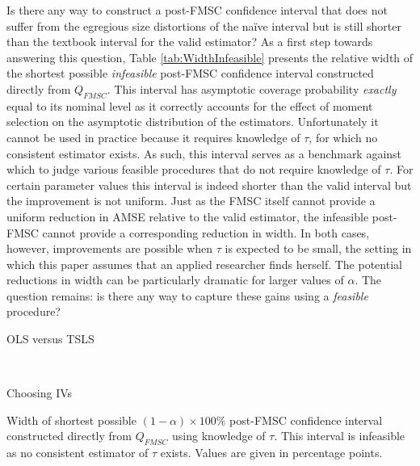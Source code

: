 Is there any way to construct a post-FMSC confidence interval that does not suffer from the egregious size distortions of the na\"{i}ve interval but is still shorter than the textbook interval for the valid estimator?
As a first step towards answering this question, Table \ref{tab:WidthInfeasible} presents the relative width of the shortest possible \emph{infeasible} post-FMSC confidence interval constructed directly from $Q_{FMSC}$.
This interval has asymptotic coverage probability \emph{exactly} equal to its nominal level as it correctly accounts for the effect of moment selection on the asymptotic distribution of the estimators.
Unfortunately it cannot be used in practice because it requires knowledge of $\tau$, for which no consistent estimator exists.
As such, this interval serves as a benchmark against which to judge various feasible procedures that do not require knowledge of $\tau$.
For certain parameter values this interval is indeed shorter than the valid interval but the improvement is not uniform.
Just as the FMSC itself cannot provide a uniform reduction in AMSE relative to the valid estimator, the infeasible post-FMSC cannot provide a corresponding reduction in width.
In both cases, however, improvements are possible when $\tau$ is expected to be small, the setting in which this paper assumes that an applied researcher finds herself. 
The potential reductions in width can be particularly dramatic for larger values of $\alpha$.
The question remains: is there any way to capture these gains using a \emph{feasible} procedure?


\begin{table}[h]
  \centering
  \begin{subtable}{0.48\textwidth}
    \caption{OLS versus TSLS}
    
  \end{subtable}
  ~
  \begin{subtable}{0.48\textwidth}
    \caption{Choosing IVs}
    
  \end{subtable}
  \caption{Width of shortest possible $(1-\alpha)\times 100\%$ post-FMSC confidence interval constructed directly from $Q_{FMSC}$ using knowledge of $\tau$. This interval is infeasible as no consistent estimator of $\tau$ exists. Values are given in percentage points.}
  \label{tab:WidthInfeasible}
\end{table}

